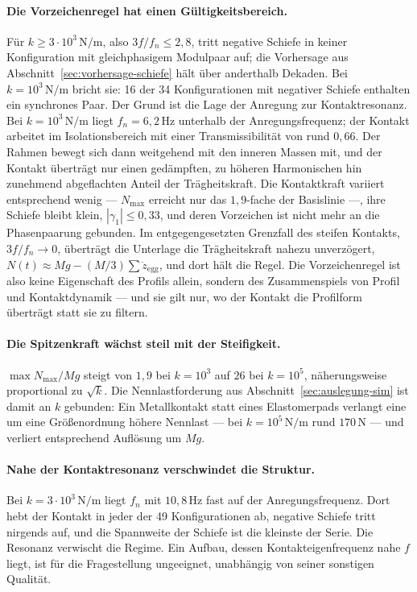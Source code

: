 \documentclass[12pt,a4paper]{report}
\begin{document}
\paragraph{Die Vorzeichenregel hat einen Gültigkeitsbereich.}
Für $k \geq 3\cdot10^{3}\,\mathrm{N/m}$, also $3f/f_n \leq 2{,}8$, tritt
negative Schiefe in keiner Konfiguration mit gleichphasigem Modulpaar
auf; die Vorhersage aus Abschnitt~\ref{sec:vorhersage-schiefe} hält über
anderthalb Dekaden. Bei $k = 10^{3}\,\mathrm{N/m}$ bricht sie: 16 der 34
Konfigurationen mit negativer Schiefe enthalten ein synchrones Paar. Der
Grund ist die Lage der Anregung zur Kontaktresonanz. Bei
$k = 10^{3}\,\mathrm{N/m}$ liegt $f_n = 6{,}2\,\mathrm{Hz}$ unterhalb
der Anregungsfrequenz; der Kontakt arbeitet im Isolationsbereich mit
einer Transmissibilität von rund $0{,}66$. Der Rahmen bewegt sich dann
weitgehend mit den inneren Massen mit, und der Kontakt überträgt nur
einen gedämpften, zu höheren Harmonischen hin zunehmend abgeflachten
Anteil der Trägheitskraft. Die Kontaktkraft variiert entsprechend wenig
--- $N_{\max}$ erreicht nur das $1{,}9$-fache der Basislinie ---, ihre
Schiefe bleibt klein, $|\gamma_1| \leq 0{,}33$, und deren Vorzeichen ist
nicht mehr an die Phasenpaarung gebunden. Im entgegengesetzten Grenzfall
des steifen Kontakts, $3f/f_n \to 0$, überträgt die Unterlage die
Trägheitskraft nahezu unverzögert, $N(t) \approx Mg - (M/3)\sum
\ddot{z}_{\mathrm{egg}}$, und dort hält die Regel. Die Vorzeichenregel
ist also keine Eigenschaft des Profils allein, sondern des Zusammenspiels
von Profil und Kontaktdynamik --- und sie gilt nur, wo der Kontakt die
Profilform überträgt statt sie zu filtern.

\paragraph{Die Spitzenkraft wächst steil mit der Steifigkeit.}
$\max N_{\max}/Mg$ steigt von $1{,}9$ bei $k = 10^{3}$ auf $26$ bei
$k = 10^{5}$, näherungsweise proportional zu $\sqrt{k}$. Die
Nennlastforderung aus Abschnitt~\ref{sec:auslegung-sim} ist damit an
$k$ gebunden: Ein Metallkontakt statt eines Elastomerpads verlangt eine
um eine Größenordnung höhere Nennlast --- bei
$k = 10^{5}\,\mathrm{N/m}$ rund $170\,\mathrm{N}$ --- und verliert
entsprechend Auflösung um $Mg$.

\paragraph{Nahe der Kontaktresonanz verschwindet die Struktur.}
Bei $k = 3\cdot10^{3}\,\mathrm{N/m}$ liegt $f_n$ mit $10{,}8\,\mathrm{Hz}$
fast auf der Anregungsfrequenz. Dort hebt der Kontakt in jeder der 49
Konfigurationen ab, negative Schiefe tritt nirgends auf, und die
Spannweite der Schiefe ist die kleinste der Serie. Die Resonanz
verwischt die Regime. Ein Aufbau, dessen Kontakteigenfrequenz nahe $f$
liegt, ist für die Fragestellung ungeeignet, unabhängig von seiner
sonstigen Qualität.
\end{document}

